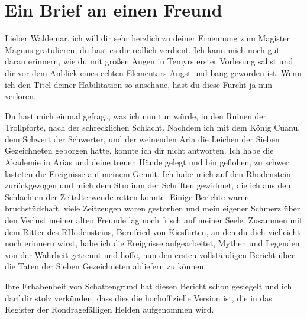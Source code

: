 \documentclass[11pt]{scrreprt}
\begin{document}
\chapter{Ein Brief an einen Freund}


Lieber Waldemar,
ich will dir sehr herzlich zu deiner Ernennung zum Magister Magnus gratulieren, du hast es dir redlich verdient. Ich kann mich noch gut daran erinnern, wie du mit großen Augen in Temyrs erster Vorlesung sahst und dir vor dem Anblick eines echten Elementars Angst und bang geworden ist. Wenn ich den Titel deiner Habilitation so anschaue, hast du diese Furcht ja nun verloren.\par\medskip
Du hast mich einmal gefragt, was ich nun tun würde, in den Ruinen der Trollpforte, nach der schrecklichen Schlacht. Nachdem ich mit dem König Cuanu, dem Schwert der Schwerter, und der weinenden Aria die Leichen der Sieben Gezeichneten geborgen hatte, konnte ich dir nicht antworten. Ich habe die Akademie in Arias und deine treuen Hände gelegt und bin geflohen, zu schwer lasteten die Ereignisse auf meinem Gemüt. Ich habe mich auf den Rhodenstein zurückgezogen und mich dem Studium der Schriften gewidmet, die ich aus den Schlachten der Zeitalterwende retten konnte. Einige Berichte waren bruchstückhaft, viele Zeitzeugen waren gestorben und mein eigener Schmerz über den Verlust meiner alten Freunde lag noch frisch auf meiner Seele. Zusammen mit dem Ritter des RHodensteins, Bernfried von Kiesfurten, an den du dich vielleicht noch erinnern wirst, habe ich die Ereignisse aufgearbeitet, Mythen und Legenden von der Wahrheit getrennt und hoffe, nun den ersten vollständigen Bericht über die Taten der Sieben Gezeichneten abliefern zu können.\par\medskip
Ihre Erhabenheit von Schattengrund hat diesen Bericht schon gesiegelt und ich darf dir stolz verkünden, dass dies die hochoffizielle Version ist, die in das Register der Rondragefälligen Helden aufgenommen wird.\par\medskip
\end{document}
